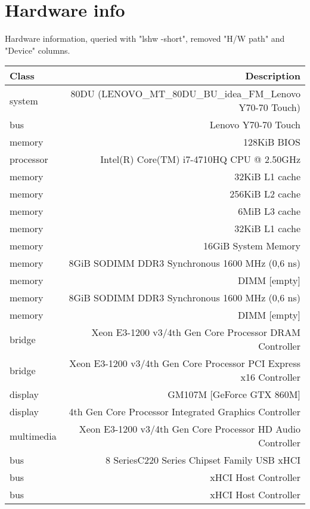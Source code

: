 \section{Hardware info}
Hardware information, queried with "lshw -short", removed "H/W path" and "Device" columns.

\begin{table}
\begin{center}
\begin{tabular}{l | r }

 Class     &     Description\\
\hline
               system        &  80DU (LENOVO\_MT\_80DU\_BU\_idea\_FM\_Lenovo Y70-70 Touch)  \\
 bus           &  Lenovo Y70-70 Touch   \\
 memory        &  128KiB BIOS   \\
 processor     &  Intel(R) Core(TM) i7-4710HQ CPU @ 2.50GHz \\
 memory        &  32KiB L1 cache    \\
 memory        &  256KiB L2 cache   \\
 memory        &  6MiB L3 cache \\
 memory        &  32KiB L1 cache    \\
 memory        &  16GiB System Memory   \\
 memory        &  8GiB SODIMM DDR3 Synchronous 1600 MHz (0,6 ns)    \\
 memory        &  DIMM [empty]  \\
 memory        &  8GiB SODIMM DDR3 Synchronous 1600 MHz (0,6 ns)    \\
 memory        &  DIMM [empty]  \\
 bridge        &  Xeon E3-1200 v3/4th Gen Core Processor DRAM Controller    \\
 bridge        &  Xeon E3-1200 v3/4th Gen Core Processor PCI Express x16 Controller \\
 display       &  GM107M [GeForce GTX 860M] \\
 display       &  4th Gen Core Processor Integrated Graphics Controller \\
 multimedia    &  Xeon E3-1200 v3/4th Gen Core Processor HD Audio Controller    \\
 bus           &  8 Series\/C220 Series Chipset Family USB xHCI  \\
 bus           &  xHCI Host Controller  \\
 bus           &  xHCI Host Controller  \\

\end{tabular}
\end{center}
\end{table}
